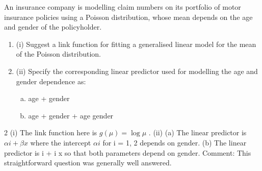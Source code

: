 \documentclass[a4paper,12pt]{article}
\begin{document}
 

\large

An insurance company is modelling claim numbers on its portfolio of motor insurance
policies using a Poisson distribution, whose mean depends on the age and gender of
the policyholder.
\begin{enumerate}
\item (i) Suggest a link function for fitting a generalised linear model for the mean of
the Poisson distribution.

\item (ii) Specify the corresponding linear predictor used for modelling the age and
gender dependence as:
\begin{enumerate}[(a)]
\item age + gender
\item age + gender + age \times gender
\end{enumerate}
\end{enumerate}

2
(i) The link function here is $g ( \mu  ) = \log \mu $ .
(ii) (a) The linear predictor is $\alpha i + \beta x$ where the intercept $\alpha i$ for i = 1, 2
depends on gender.
(b) The linear predictor is \alpha i + \beta i x so that both parameters depend on
gender.
Comment: This straightforward question was generally well answered.
\end{document}
